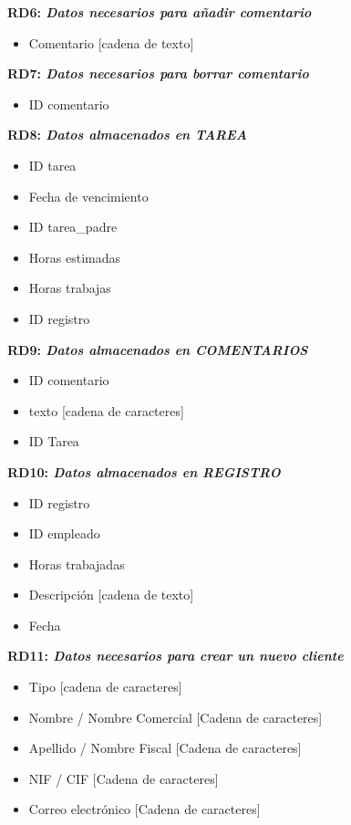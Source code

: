 \documentclass[paper=a4, fontsize=11pt, spanish]{scrartcl}
\begin{document}
\setlength{\parindent}{0em}
\textbf{RD6: \textit{Datos necesarios para añadir comentario}}
\setlength{\parindent}{2em}
\begin{itemize}
\item Comentario [cadena de texto]
\end{itemize}

\setlength{\parindent}{0em}
\textbf{RD7: \textit{Datos necesarios para borrar comentario}}
\setlength{\parindent}{2em}
\begin{itemize}
\item ID comentario
\end{itemize}

\setlength{\parindent}{0em}
\textbf{RD8: \textit{Datos almacenados en TAREA}}
\setlength{\parindent}{2em}
\begin{itemize}
\item ID tarea
\item Fecha de vencimiento
\item ID tarea\_padre
\item Horas estimadas 
\item Horas trabajas 
\item ID registro
\end{itemize}

\setlength{\parindent}{0em}
\textbf{RD9: \textit{Datos almacenados en COMENTARIOS}}
\setlength{\parindent}{2em}
\begin{itemize}
\item ID comentario
\item texto [cadena de caracteres]
\item ID Tarea
\end{itemize}

\setlength{\parindent}{0em}
\textbf{RD10: \textit{Datos almacenados en REGISTRO}}
\setlength{\parindent}{2em}
\begin{itemize}
\item ID registro
\item ID empleado
\item Horas trabajadas
\item Descripción [cadena de texto]
\item Fecha
\end{itemize}

\setlength{\parindent}{0em}
\textbf{RD11: \textit{ Datos necesarios para crear un nuevo cliente}}
\setlength{\parindent}{2em}
\begin{itemize}
\item Tipo [cadena de caracteres]
\item Nombre / Nombre Comercial [Cadena de caracteres]
\item Apellido / Nombre Fiscal [Cadena de caracteres]
\item NIF / CIF [Cadena de caracteres]
\item Correo electrónico [Cadena de caracteres]
\end{itemize}
\end{document}
